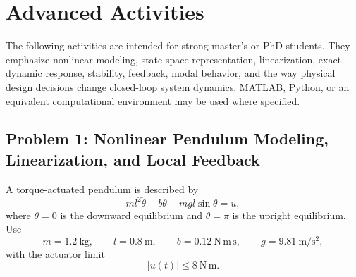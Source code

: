 
\section{Advanced Activities}

The following activities are intended for strong master's or PhD students.
They emphasize nonlinear modeling, state-space representation, linearization,
exact dynamic response, stability, feedback, modal behavior, and the way
physical design decisions change closed-loop system dynamics. MATLAB, Python,
or an equivalent computational environment may be used where specified.

\subsection*{Problem 1: Nonlinear Pendulum Modeling, Linearization, and Local Feedback}

A torque-actuated pendulum is described by
\begin{equation}
ml^2\ddot{\theta}
+
b\dot{\theta}
+
mgl\sin\theta
=
u,
\end{equation}
where $\theta=0$ is the downward equilibrium and $\theta=\pi$ is the upright
equilibrium. Use
\begin{equation}
m=1.2~\mathrm{kg},
\qquad
l=0.8~\mathrm{m},
\qquad
b=0.12~\mathrm{N\,m\,s},
\qquad
g=9.81~\mathrm{m/s^2},
\end{equation}
with the actuator limit
\begin{equation}
|u(t)|\leq 8~\mathrm{N\,m}.
\end{equation}

